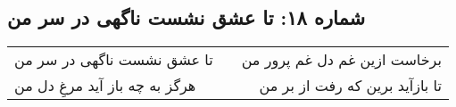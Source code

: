 \begin{center}
\section*{شماره ۱۸: تا عشق نشست ناگهی در سر من}
\label{sec:018}
\begin{longtable}{l p{0.5cm} r}
تا عشق نشست ناگهی در سر من
&&
برخاست ازین غم دل غم پرور من
\\
هرگز به چه باز آید مرغِ دل من
&&
تا بازآید برین که رفت از بر من
\\
\end{longtable}
\end{center}
